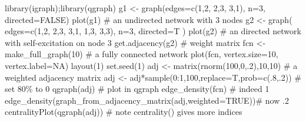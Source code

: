 \documentclass[
  a4paper,
  DIV=11,
  numbers=noendperiod,
  oneside]{scrreprt}
\newenvironment{Shaded}{}{}
\newcommand{\AttributeTok}[1]{\textcolor[rgb]{0.84,0.23,0.29}{#1}}
\newcommand{\CommentTok}[1]{\textcolor[rgb]{0.42,0.45,0.49}{#1}}
\newcommand{\ConstantTok}[1]{\textcolor[rgb]{0.00,0.36,0.77}{#1}}
\newcommand{\DecValTok}[1]{\textcolor[rgb]{0.00,0.36,0.77}{#1}}
\newcommand{\FunctionTok}[1]{\textcolor[rgb]{0.44,0.26,0.76}{#1}}
\newcommand{\NormalTok}[1]{\textcolor[rgb]{0.14,0.16,0.18}{#1}}
\newcommand{\OtherTok}[1]{\textcolor[rgb]{0.44,0.26,0.76}{#1}}
\newcommand{\SpecialCharTok}[1]{\textcolor[rgb]{0.00,0.36,0.77}{#1}}
\begin{document}
\begin{Shaded}
\begin{Highlighting}[]
\FunctionTok{library}\NormalTok{(igraph);}\FunctionTok{library}\NormalTok{(qgraph)}
\NormalTok{g1 }\OtherTok{\textless{}{-}} \FunctionTok{graph}\NormalTok{(}\AttributeTok{edges=}\FunctionTok{c}\NormalTok{(}\DecValTok{1}\NormalTok{,}\DecValTok{2}\NormalTok{, }\DecValTok{2}\NormalTok{,}\DecValTok{3}\NormalTok{, }\DecValTok{3}\NormalTok{,}\DecValTok{1}\NormalTok{), }\AttributeTok{n=}\DecValTok{3}\NormalTok{, }\AttributeTok{directed=}\ConstantTok{FALSE}\NormalTok{) }
\FunctionTok{plot}\NormalTok{(g1) }\CommentTok{\# an undirected network with 3 nodes}
\NormalTok{g2 }\OtherTok{\textless{}{-}} \FunctionTok{graph}\NormalTok{( }\AttributeTok{edges=}\FunctionTok{c}\NormalTok{(}\DecValTok{1}\NormalTok{,}\DecValTok{2}\NormalTok{, }\DecValTok{2}\NormalTok{,}\DecValTok{3}\NormalTok{, }\DecValTok{3}\NormalTok{,}\DecValTok{1}\NormalTok{, }\DecValTok{1}\NormalTok{,}\DecValTok{3}\NormalTok{, }\DecValTok{3}\NormalTok{,}\DecValTok{3}\NormalTok{), }\AttributeTok{n=}\DecValTok{3}\NormalTok{, }\AttributeTok{directed=}\NormalTok{T ) }
\FunctionTok{plot}\NormalTok{(g2) }\CommentTok{\# an directed network with self{-}excitation on node 3}
\FunctionTok{get.adjacency}\NormalTok{(g2) }\CommentTok{\# weight matrix}
\NormalTok{fcn }\OtherTok{\textless{}{-}} \FunctionTok{make\_full\_graph}\NormalTok{(}\DecValTok{10}\NormalTok{) }\CommentTok{\# a fully connected network}
\FunctionTok{plot}\NormalTok{(fcn, }\AttributeTok{vertex.size=}\DecValTok{10}\NormalTok{, }\AttributeTok{vertex.label=}\ConstantTok{NA}\NormalTok{)}
\FunctionTok{layout}\NormalTok{(}\DecValTok{1}\NormalTok{)}
\FunctionTok{set.seed}\NormalTok{(}\DecValTok{1}\NormalTok{)}
\NormalTok{adj }\OtherTok{\textless{}{-}} \FunctionTok{matrix}\NormalTok{(}\FunctionTok{rnorm}\NormalTok{(}\DecValTok{100}\NormalTok{,}\DecValTok{0}\NormalTok{,.}\DecValTok{2}\NormalTok{),}\DecValTok{10}\NormalTok{,}\DecValTok{10}\NormalTok{) }\CommentTok{\# a weighted adjacency matrix}
\NormalTok{adj }\OtherTok{\textless{}{-}}\NormalTok{ adj}\SpecialCharTok{*}\FunctionTok{sample}\NormalTok{(}\DecValTok{0}\SpecialCharTok{:}\DecValTok{1}\NormalTok{,}\DecValTok{100}\NormalTok{,}\AttributeTok{replace=}\NormalTok{T,}\AttributeTok{prob=}\FunctionTok{c}\NormalTok{(.}\DecValTok{8}\NormalTok{,.}\DecValTok{2}\NormalTok{)) }\CommentTok{\# set 80\% to 0}
\FunctionTok{qgraph}\NormalTok{(adj) }\CommentTok{\# plot in qgraph}
\FunctionTok{edge\_density}\NormalTok{(fcn) }\CommentTok{\# indeed 1}
\FunctionTok{edge\_density}\NormalTok{(}\FunctionTok{graph\_from\_adjacency\_matrix}\NormalTok{(adj,}\AttributeTok{weighted=}\ConstantTok{TRUE}\NormalTok{))}\CommentTok{\# now .2}
\FunctionTok{centralityPlot}\NormalTok{(}\FunctionTok{qgraph}\NormalTok{(adj)) }\CommentTok{\# note centrality() gives more indices}
\end{Highlighting}
\end{Shaded}
\end{document}
